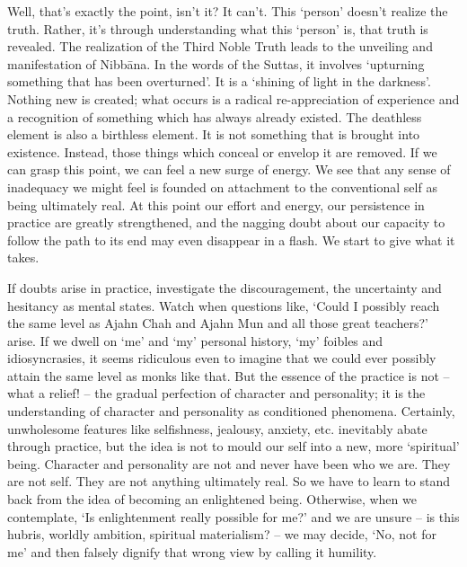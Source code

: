Well, that's exactly the point, isn't it? It can't. This `person'
doesn't realize the truth. Rather, it's through understanding what this
`person' is, that truth is revealed. The realization of the Third Noble
Truth leads to the unveiling and manifestation of Nibbāna. In the words
of the Suttas, it involves `upturning something that has been
overturned'. It is a `shining of light in the darkness'. Nothing new is
created; what occurs is a radical re-appreciation of experience and a
recognition of something which has always already existed. The deathless
element is also a birthless element. It is not something that is brought
into existence. Instead, those things which conceal or envelop it are
removed. If we can grasp this point, we can feel a new surge of energy. 
We see that any sense of inadequacy we might feel is founded on
attachment to the conventional self as being ultimately real. At this
point our effort and energy, our persistence in practice are greatly
strengthened, and the nagging doubt about our capacity to follow the
path to its end may even disappear in a flash. We start to give what it
takes. 

If doubts arise in practice, investigate the discouragement, the
uncertainty and hesitancy as mental states. Watch when questions like, 
`Could I possibly reach the same level as Ajahn Chah and Ajahn Mun and
all those great teachers?' arise. If we dwell on `me' and `my' personal
history, `my' foibles and idiosyncrasies, it seems ridiculous even to
imagine that we could ever possibly attain the same level as monks like
that. But the essence of the practice is not -- what a relief! -- the
gradual perfection of character and personality; it is the understanding
of character and personality as conditioned phenomena. Certainly, 
unwholesome features like selfishness, jealousy, anxiety, etc. 
inevitably abate through practice, but the idea is not to mould our self
into a new, more `spiritual' being. Character and personality are not
and never have been who we are. They are not self. They are not anything
ultimately real. So we have to learn to stand back from the idea of
becoming an enlightened being. Otherwise, when we contemplate, `Is
enlightenment really possible for me?' and we are unsure -- is this
hubris, worldly ambition, spiritual materialism? -- we may decide, `No, 
not for me' and then falsely dignify that wrong view by calling it
humility. 

